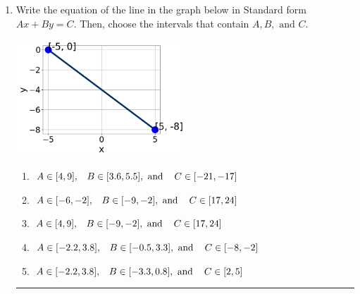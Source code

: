 \documentclass[14pt]{extbook}
\newcommand{\litem}[1]{\item#1\hspace*{-1cm}\rule{\textwidth}{0.4pt}}
\begin{document}
\begin{enumerate}
{\begin{enumerate}[label=\Alph*.]
\end{enumerate} }
\litem{
Write the equation of the line in the graph below in Standard form $Ax+By=C$. Then, choose the intervals that contain $A, B, \text{ and } C$.
\begin{center}
    \includegraphics[width=0.5\textwidth]{../Figures/linearGraphToStandardA.png}
\end{center}
\begin{enumerate}[label=\Alph*.]
\item \( A \in [4, 9], \hspace{3mm} B \in [3.6, 5.5], \text{ and } \hspace{3mm} C \in [-21, -17] \)
\item \( A \in [-6, -2], \hspace{3mm} B \in [-9, -2], \text{ and } \hspace{3mm} C \in [17, 24] \)
\item \( A \in [4, 9], \hspace{3mm} B \in [-9, -2], \text{ and } \hspace{3mm} C \in [17, 24] \)
\item \( A \in [-2.2, 3.8], \hspace{3mm} B \in [-0.5, 3.3], \text{ and } \hspace{3mm} C \in [-8, -2] \)
\item \( A \in [-2.2, 3.8], \hspace{3mm} B \in [-3.3, 0.8], \text{ and } \hspace{3mm} C \in [2, 5] \)

\end{enumerate} }
\end{enumerate}
\end{document}
